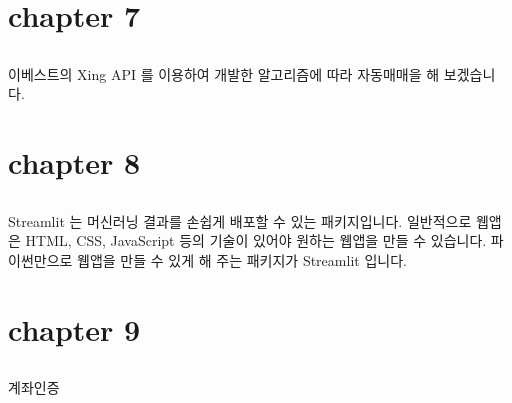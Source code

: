 \documentclass[letterpaper,10pt,english]{jupyterBook}
\begin{document}
\part{chapter 7}


\chapter{}
\label{\detokenize{chapter7/7.0.0_Algo_Trading:id1}}\label{\detokenize{chapter7/7.0.0_Algo_Trading::doc}}
\sphinxAtStartPar
이베스트의 Xing API 를 이용하여 개발한 알고리즘에 따라 자동매매을 해 보겠습니다.


\part{chapter 8}


\chapter{}
\label{\detokenize{chapter8/8.0.0_Web_Application:webapp}}\label{\detokenize{chapter8/8.0.0_Web_Application::doc}}
\sphinxAtStartPar
Streamlit 는 머신러닝 결과를 손쉽게 배포할 수 있는 패키지입니다. 일반적으로 웹앱은 HTML, CSS, JavaScript 등의 기술이 있어야 원하는 웹앱을 만들 수 있습니다. 파이썬만으로 웹앱을 만들 수 있게 해 주는 패키지가 Streamlit 입니다.


\part{chapter 9}


\chapter{}
\label{\detokenize{chapter9/9.0.0_POC:id1}}\label{\detokenize{chapter9/9.0.0_POC::doc}}
\sphinxAtStartPar
계좌인증







\renewcommand{\indexname}{Index}
\printindex
\end{document}
